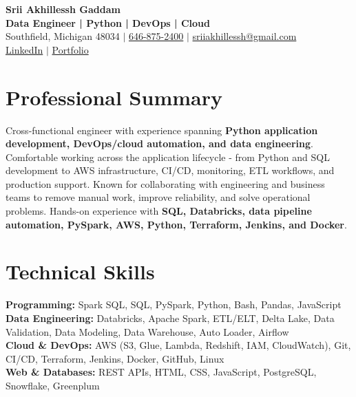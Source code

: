 \documentclass[letterpaper,10pt]{article}
\begin{document}
\fontsize{9.35pt}{10.45pt}\selectfont

\begin{center}
    {\LARGE \textbf{Srii Akhillessh Gaddam}} \\[-1pt]
    \textbf{Data Engineer | Python | DevOps | Cloud} \\[2pt]
    Southfield, Michigan 48034 $|$
    \href{tel:6468752400}{646-875-2400} $|$
    \href{mailto:sriiakhillessh@gmail.com}{sriiakhillessh@gmail.com} \\[1pt]
    \href{https://www.linkedin.com/in/srii-akhiilessh-gaddam-b48668191/}{LinkedIn} $|$
    \href{https://sriiakhillesshg.github.io/portfolio/}{Portfolio}
\end{center}
\vspace{-8pt}

\section{Professional Summary}
\small{Cross-functional engineer with experience spanning \textbf{Python application development, DevOps/cloud automation, and data engineering}. Comfortable working across the application lifecycle - from Python and SQL development to AWS infrastructure, CI/CD, monitoring, ETL workflows, and production support. Known for collaborating with engineering and business teams to remove manual work, improve reliability, and solve operational problems. Hands-on experience with \textbf{SQL, Databricks, data pipeline automation, PySpark, AWS, Python, Terraform, Jenkins, and Docker}.}

\section{Technical Skills}
\small{
\textbf{Programming:} Spark SQL, SQL, PySpark, Python, Bash, Pandas, JavaScript \\
\textbf{Data Engineering:} Databricks, Apache Spark, ETL/ELT, Delta Lake, Data Validation, Data Modeling, Data Warehouse, Auto Loader, Airflow \\
\textbf{Cloud \& DevOps:} AWS (S3, Glue, Lambda, Redshift, IAM, CloudWatch), Git, CI/CD, Terraform, Jenkins, Docker, GitHub, Linux \\
\textbf{Web \& Databases:} REST APIs, HTML, CSS, JavaScript, PostgreSQL, Snowflake, Greenplum
}
\end{document}
